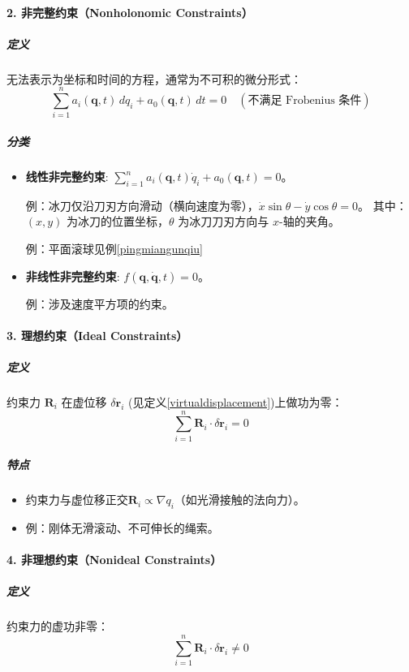 \documentclass[12pt, a4paper, oneside, UTF8]{ctexbook}  %
\begin{document}
\paragraph*{2. 非完整约束（Nonholonomic Constraints）}
\subparagraph*{定义}
无法表示为坐标和时间的方程，通常为不可积的微分形式：
\begin{equation}
    \sum_{i=1}^n a_i(\mathbf{q}, t) \, dq_i + a_0(\mathbf{q}, t) \, dt = 0 \quad (\text{不满足 Frobenius 条件})
\end{equation}

\subparagraph*{分类}
\begin{itemize}
    \item \textbf{线性非完整约束}: \( \sum_{i=1}^n a_i(\mathbf{q}, t) \dot{q}_i + a_0(\mathbf{q}, t) = 0 \)。\par
    例：冰刀仅沿刀刃方向滑动（横向速度为零），\(
        \dot{x} \sin \theta - \dot{y} \cos \theta = 0
    \)。
    其中：\((x, y)\) 为冰刀的位置坐标，\(\theta\) 为冰刀刀刃方向与 \(x\)-轴的夹角。\par
    例：平面滚球见例\ref{pingmiangunqiu}
    \item \textbf{非线性非完整约束}: \( f(\mathbf{q}, \dot{\mathbf{q}}, t) = 0 \)。\par
    例：涉及速度平方项的约束。
\end{itemize}

\paragraph*{3. 理想约束（Ideal Constraints）}
\subparagraph*{定义}
约束力 \(\mathbf{R}_i\) 在虚位移 \(\delta \mathbf{r}_i\) (见定义\ref{virtualdisplacement})上做功为零：
\begin{equation}
    \sum_{i=1}^n \mathbf{R}_i \cdot \delta \mathbf{r}_i = 0
\end{equation}

\subparagraph*{特点}
\begin{itemize}
    \item 约束力与虚位移正交\(\mathbf{R}_i\propto \nabla q_i\)（如光滑接触的法向力）。
    \item 例：刚体无滑滚动、不可伸长的绳索。
\end{itemize}

\paragraph*{4. 非理想约束（Nonideal Constraints）}
\subparagraph*{定义}
约束力的虚功非零：
\begin{equation}
    \sum_{i=1}^n \mathbf{R}_i \cdot \delta \mathbf{r}_i \neq 0
\end{equation}
\end{document}
